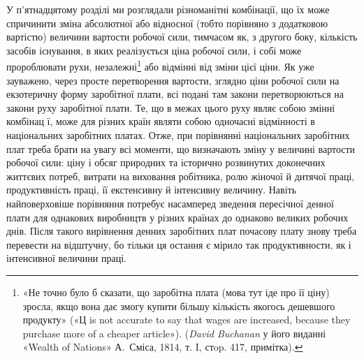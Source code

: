 У п’ятнадцятому розділі ми розглядали різноманітні комбінації,
що їх може спричинити зміна абсолютної або відносної
(тобто порівняно з додатковою вартістю) величини вартости робочої
сили, тимчасом як, з другого боку, кількість засобів існування,
в яких реалізується ціна робочої сили, і собі може пророблювати
рухи, незалежні\footnote{
«Не точно було б сказати, що заробітна плата (мова тут іде про
її ціну) зросла, якщо вона дає змогу купити більшу кількість якогось
дешевшого продукту» («Ц is not accurate to say that wages are increased,
because they purchase more of a cheaper article»). (\emph{David Buchanan}
у його виданні «Wealth of Nations» А.~Сміса, 1814, т. I, стop. 417,
примітка).
} або відмінні від зміни цієї ціни. Як уже зауважено,
через просте перетворення вартости, зглядно ціни робочої
сили на екзотеричну форму заробітної плати, всі подані там
закони перетворюються на закони руху заробітної плати. Те,
що в межах цього руху являє собою змінні комбінац ї, може для
різних країн являти собою одночасні відмінності в національних
заробітних платах. Отже, при порівнянні національних заробітних
плат треба брати на увагу всі моменти, що визначають зміну
у величині вартости робочої сили: ціну і обсяг природних та
історично розвинутих доконечних життєвих потреб, витрати
на виховання робітника, ролю жіночої й дитячої праці, продуктивність
праці, її екстенсивну й інтенсивну величину. Навіть
найповерховіше порівняння потребує насамперед зведення пересічної
денної плати для однакових виробництв у різних країнах
до однаково великих робочих днів. Після такого вирівнення денних
заробітних плат почасову плату знову треба перевести на
відштучну, бо тільки ця остання є мірило так продуктивности,
як і інтенсивної величини праці.
